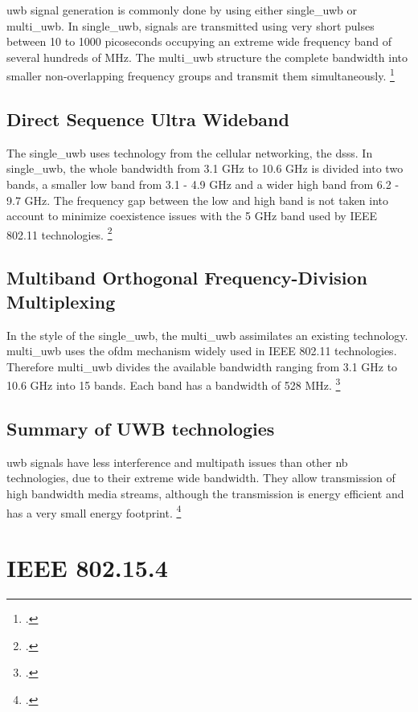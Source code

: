 \gls{uwb} signal generation is commonly done by using either \gls{single_uwb} or \gls{multi_uwb}. In \gls{single_uwb}, signals are transmitted using very short pulses between 10 to 1000 picoseconds occupying an extreme wide frequency band of several hundreds of MHz. The \gls{multi_uwb} structure the complete bandwidth into smaller non-overlapping frequency groups and transmit them simultaneously. \footcite[Cf.][146]{Lau2009}

\subsection{Direct Sequence Ultra Wideband}

The \gls{single_uwb} uses technology from the cellular networking, the \gls{dsss}. In \gls{single_uwb}, the whole bandwidth from 3.1 GHz to 10.6 GHz is divided into two bands, a smaller low band from 3.1 - 4.9 GHz and a wider high band from 6.2 - 9.7 GHz. The frequency gap between the low and high band is not taken into account to minimize coexistence issues with the 5 GHz band used by IEEE 802.11 technologies. \footcite[Cf.][470-471]{Pahlavan2009}

\subsection{Multiband Orthogonal Frequency-Division Multiplexing}

In the style of the \gls{single_uwb}, the \gls{multi_uwb} assimilates an existing technology. \gls{multi_uwb} uses the \gls{ofdm} mechanism widely used in IEEE 802.11 technologies. Therefore \gls{multi_uwb} divides the available bandwidth ranging from 3.1 GHz to 10.6 GHz into 15 bands. Each band has a bandwidth of 528 MHz. \footcite[Cf.][474]{Pahlavan2009}

\subsection{Summary of UWB technologies}

\gls{uwb} signals have less interference and multipath issues than other \gls{nb} technologies, due to their extreme wide bandwidth. They allow transmission of high bandwidth media streams, although the transmission is energy efficient and has a very small energy footprint. \footcite[Cf.][146]{Lau2009}

\section{IEEE 802.15.4}
\label{sec:}

